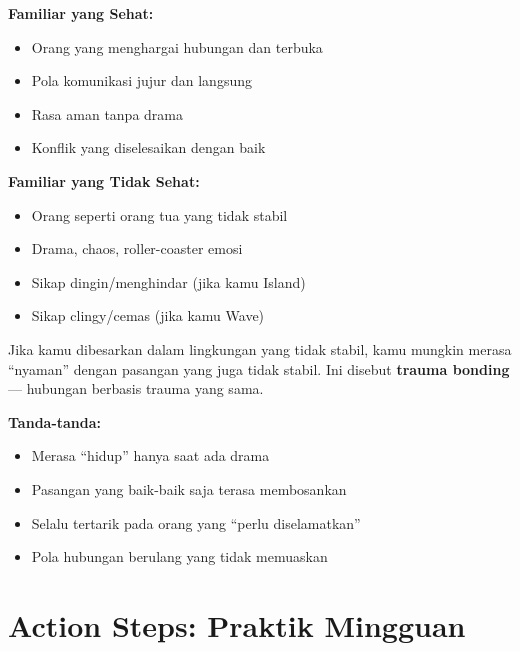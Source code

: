 \begin{praktikbox}
\textbf{Familiar yang Sehat:}
\begin{itemize}
    \item Orang yang menghargai hubungan dan terbuka
    \item Pola komunikasi jujur dan langsung
    \item Rasa aman tanpa drama
    \item Konflik yang diselesaikan dengan baik
\end{itemize}

\textbf{Familiar yang Tidak Sehat:}
\begin{itemize}
    \item Orang seperti orang tua yang tidak stabil
    \item Drama, chaos, roller-coaster emosi
    \item Sikap dingin/menghindar (jika kamu Island)
    \item Sikap clingy/cemas (jika kamu Wave)
\end{itemize}
\end{praktikbox}

\begin{warningbox}
Jika kamu dibesarkan dalam lingkungan yang tidak stabil, kamu mungkin merasa ``nyaman'' dengan pasangan yang juga tidak stabil. Ini disebut \textbf{trauma bonding} --- hubungan berbasis trauma yang sama.

\textbf{Tanda-tanda:}
\begin{itemize}
    \item Merasa ``hidup'' hanya saat ada drama
    \item Pasangan yang baik-baik saja terasa membosankan
    \item Selalu tertarik pada orang yang ``perlu diselamatkan''
    \item Pola hubungan berulang yang tidak memuaskan
\end{itemize}
\end{warningbox}

\section{Action Steps: Praktik Mingguan}

